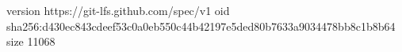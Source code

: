 version https://git-lfs.github.com/spec/v1
oid sha256:d430ec843cdeef53c0a0eb550c44b42197e5ded80b7633a9034478bb8c1b8b64
size 11068
